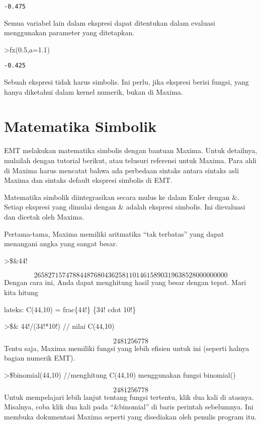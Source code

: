 \documentclass[
]{book}
\begin{document}
\begin{verbatim}
-0.475
\end{verbatim}

Semua variabel lain dalam ekspresi dapat ditentukan dalam evaluasi menggunakan parameter yang ditetapkan.

\textgreater fx(0.5,a=1.1)

\begin{verbatim}
-0.425
\end{verbatim}

Sebuah ekspresi tidak harus simbolis. Ini perlu, jika ekspresi berisi fungsi, yang hanya diketahui dalam kernel numerik, bukan di Maxima.

\chapter{Matematika Simbolik}\label{matematika-simbolik}

EMT melakukan matematika simbolis dengan bantuan Maxima. Untuk detailnya, mulailah dengan tutorial berikut, atau telusuri referensi untuk Maxima. Para ahli di Maxima harus mencatat bahwa ada perbedaan sintaks antara sintaks asli Maxima dan sintaks default ekspresi simbolis di EMT.

Matematika simbolik diintegrasikan secara mulus ke dalam Euler dengan \&. Setiap ekspresi yang dimulai dengan \& adalah ekspresi simbolis. Ini dievaluasi dan dicetak oleh Maxima.

Pertama-tama, Maxima memiliki aritmatika ``tak terbatas'' yang dapat menangani angka yang sangat besar.

\textgreater\$\&44!

\[2658271574788448768043625811014615890319638528000000000\]Dengan cara ini, Anda dapat menghitung hasil yang besar dengan tepat. Mari kita hitung

lateks: C(44,10) = frac\{44!\} \{34! cdot 10!\}

\textgreater\$\& 44!/(34!*10!) // nilai C(44,10)

\[2481256778\]Tentu saja, Maxima memiliki fungsi yang lebih efisien untuk ini (seperti halnya bagian numerik EMT).

\textgreater\$binomial(44,10) //menghitung C(44,10) menggunakan fungsi binomial()

\[2481256778\]Untuk mempelajari lebih lanjut tentang fungsi tertentu, klik dua kali di atasnya. Misalnya, coba klik dua kali pada ``\&binomial'' di baris perintah sebelumnya. Ini membuka dokumentasi Maxima seperti yang disediakan oleh penulis program itu.
\end{document}
